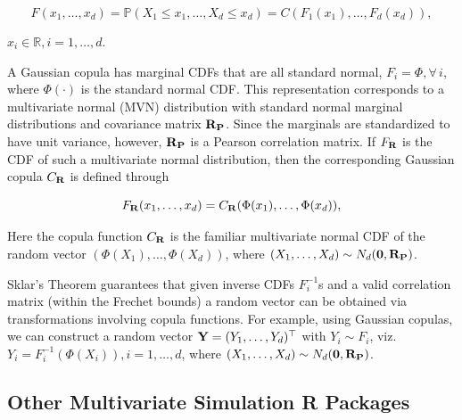 \documentclass[
]{jss}
\begin{document}
\begin{equation}
F(x_1, \ldots, x_d) = {\mathbb P}(X_1\leq x_1, \ldots,X_d\leq x_d) = C(F_1(x_1), \ldots, F_d(x_d)), 
\label{eq:copula}
\end{equation}

\(x_i \in {\mathbb R}, i=1,\ldots,d.\)

A Gaussian copula has marginal CDFs that are all standard normal,
\(F_i = \Phi, \forall \, i\), where \(\Phi(\cdot)\) is the standard
normal CDF. This representation corresponds to a multivariate normal
(MVN) distribution with standard normal marginal distributions and
covariance matrix \({\bf R_P}\). Since the marginals are standardized to
have unit variance, however, \({\bf R_P}\) is a Pearson correlation
matrix. If \(F_{{\bf R}}\) is the CDF of such a multivariate normal
distribution, then the corresponding Gaussian copula \(C_{{\bf R}}\) is
defined through

\begin{equation}
\label{eq:gauss}
F_{{\bf R}}(x_1, \ldots, x_d) = C_{{\bf R}}(\Phi(x_1), \ldots, \Phi(x_d)),
\end{equation}

Here the copula function \(C_{{\bf R}}\) is the familiar multivariate
normal CDF of the random vector \((\Phi(X_1), \ldots, \Phi(X_d))\),
where \((X_1, \ldots, X_d) \sim N_d({\bf 0}, {\bf R_P})\).

Sklar's Theorem \citep{Sklar1959, Ubeda-Flores2017} guarantees that
given inverse CDFs \(F_i^{-1}\)s and a valid correlation matrix (within
the Frechet bounds) a random vector can be obtained via transformations
involving copula functions. For example, using Gaussian copulas, we can
construct a random vector \({\bf Y} = (Y_1, \ldots, Y_d)^\top\) with
\(Y_i \sim F_i\), viz.~\(Y_i = F_i^{-1}(\Phi(X_i)), i=1, \ldots, d\),
where \((X_1, \ldots, X_d) \sim N_d({\bf 0}, {\bf R_P})\).

\hypertarget{other-multivariate-simulation-r-packages}{%
\subsection{Other Multivariate Simulation R
Packages}\label{other-multivariate-simulation-r-packages}}
\end{document}
